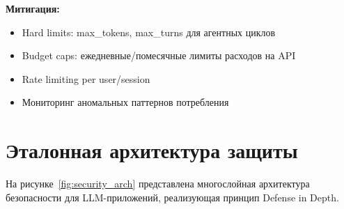 \documentclass[12pt,a4paper]{article}
\begin{document}
\textbf{Митигация:}
\begin{itemize}
  \item Hard limits: max\_tokens, max\_turns для агентных циклов
  \item Budget caps: ежедневные/помесячные лимиты расходов на API
  \item Rate limiting per user/session
  \item Мониторинг аномальных паттернов потребления
\end{itemize}


\section{Эталонная архитектура защиты}

На рисунке~\ref{fig:security_arch} представлена многослойная архитектура безопасности для LLM-приложений, реализующая принцип Defense in Depth.
\end{document}
